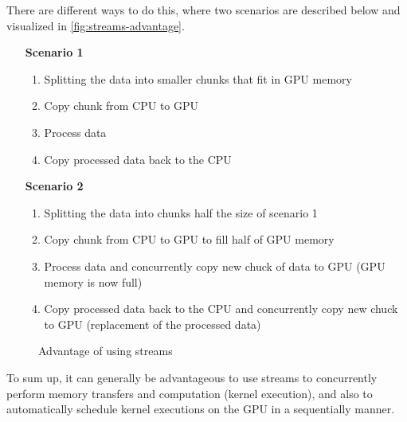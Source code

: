 There are different ways to do this, where two scenarios are described below and visualized in \autoref{fig:streams-advantage}.
\begin{enumerate}
	\item[\textbf{Scenario 1}]
		\begin{enumerate}
			\item Splitting the data into smaller chunks that fit in GPU memory
			\item Copy chunk from CPU to GPU
			\item Process data
			\item Copy processed data back to the CPU
		\end{enumerate}
	\item[\textbf{Scenario 2}]
			\begin{enumerate}
				\item Splitting the data into chunks half the size of scenario 1
				\item Copy chunk from CPU to GPU to fill half of GPU memory
				\item Process data and concurrently copy new chuck of data to GPU (GPU memory is now full)
				\item Copy processed data back to the CPU and concurrently copy new chuck to GPU (replacement of the processed data)
		\end{enumerate}
\end{enumerate}
\begin{figure}[ht]
	\centering
	\caption{Advantage of using streams}
	\label{fig:streams-advantage}
\end{figure}
To sum up, it can generally be advantageous to use streams to concurrently perform memory transfers and computation (kernel execution), and also to automatically schedule kernel executions on the GPU in a sequentially manner.
